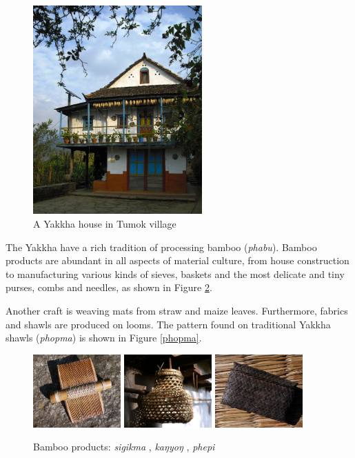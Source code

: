 \begin{figure}
\centering
\includegraphics[height=8cm]{figures/house.jpg}
\caption{A Yakkha house in Tumok village}\label{house}
\end{figure}


The Yakkha have a rich tradition of processing bamboo (\emph{phabu}). Bamboo products are abundant in all aspects  of material culture, from house construction to manufacturing various kinds of sieves, baskets and the most delicate and tiny purses, combs and needles, as shown in Figure \ref{phabu}.

Another craft is weaving mats from straw and maize leaves. Furthermore, fabrics and shawls are produced on looms.  The pattern found on traditional Yakkha shawls (\emph{phopma}) is shown in Figure \ref{phopma}. 


 \begin{figure}[h]
 \includegraphics[width=0.30\textwidth]{figures/comb.jpg}
 \hfill
 \includegraphics[width=0.30\textwidth]{figures/kangyong.jpg}
 \hfill
 \includegraphics[width=0.30\textwidth]{figures/phepi.jpg}
 \caption{Bamboo  products: \emph{sigikma} , \emph{kaŋyoŋ} , \emph{phepi} }\label{phabu}
 \end{figure}



